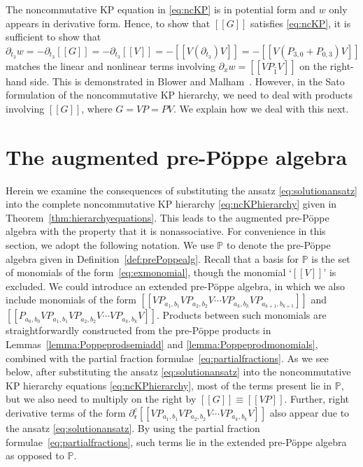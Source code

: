 \documentclass[5p,twocolumn]{elsarticle}
\newcommand*{\pa}{{\partial}}
\newcommand*{\lb}{[\![}
\newcommand*{\rb}{]\!]}
\newcommand*{\rl}{\mathfrak r}
\begin{document}
%
The noncommutative KP equation in \eqref{eq:ncKP} is in potential form and $w$ only appears in derivative form. 
Hence, to show that $\lb G\rb$ satisfies \eqref{eq:ncKP}, it is sufficient to show that
$\pa_{t_3}w=-\pa_{t_3}\lb G\rb=-\pa_{t_3}\lb V\rb=-\lb V(\pa_{t_3})V\rb=-\lb V(P_{3,0}+P_{0,3})V\rb$
matches the linear and nonlinear terms involving $\pa_xw=\lb VP_{\hat{1}}V\rb$ on the right-hand side.
This is demonstrated in Blower and Malham~\cite[Sec.~3]{BM-KP}.
However, in the Sato formulation of the noncommutative KP hierarchy, we need to deal with products involving $\lb G\rb$, where $G=VP=PV$.
We explain how we deal with this next.



\section{The augmented pre-P\"oppe algebra}\label{sec:steptodescents}
Herein we examine the consequences of substituting the ansatz \eqref{eq:solutionansatz} into the complete noncommutative KP hierarchy \eqref{eq:ncKPhierarchy} given in Theorem~\ref{thm:hierarchyequations}.
This leads to the augmented pre-P\"oppe algebra with the property that it is nonassociative. 
For convenience in this section, we adopt the following notation. We use $\mathbb P$ to denote the pre-P\"oppe algebra given in Definition~\ref{def:prePoppealg}.
Recall that a basis for $\mathbb P$ is the set of monomials of the form~\eqref{eq:exmonomial}, though the monomial `$\lb V\rb$' is excluded.
We could introduce an extended pre-P\"oppe algebra, in which we also include monomials of the form
$\lb VP_{a_1,b_1}VP_{a_2,b_2}V\cdots VP_{a_k,b_k}VP_{a_{k+1},b_{k+1}}\rb$ and $\lb P_{a_0,b_0}VP_{a_1,b_1}VP_{a_2,b_2}V\cdots VP_{a_k,b_k}V\rb$.
Products between such monomials are straightforwardly constructed from the pre-P\"oppe products in Lemmas~\ref{lemma:Poppeprodsemiadd} and \ref{lemma:Poppeprodmonomials}, 
combined with the partial fraction formulae~\eqref{eq:partialfractions}. 
As we see below, after substituting the ansatz \eqref{eq:solutionansatz} into the noncommutative KP hierarchy equations \eqref{eq:ncKPhierarchy}, 
most of the terms present lie in $\mathbb P$, but we also need to multiply on the right by $\lb G\rb\equiv\lb VP\rb$. 
Further, right derivative terms of the form $\pa_{\rl}^c\lb VP_{a_1,b_1}VP_{a_2,b_2}V\cdots VP_{a_k,b_k}V\rb$ also appear due to the ansatz \eqref{eq:solutionansatz}.
By using the partial fraction formulae~\eqref{eq:partialfractions}, such terms lie in the extended pre-P\"oppe algebra as opposed to $\mathbb P$.
\end{document}
